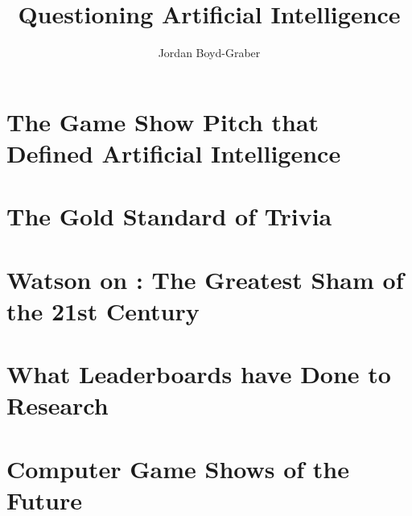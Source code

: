 \documentclass[bfivepaper,twosided,justified,nobib]{tufte-book}
\title{Questioning Artificial Intelligence}
\author{Jordan Boyd-Graber}
\newcommand{\chapterfile}[2]{\chapter{#2}
  \label{ch:#1}
  }
\begin{document}


% 



\clearpage






\chapterfile{turing}{The Game Show Pitch that Defined Artificial Intelligence}

\chapterfile{qb}{The Gold Standard of Trivia}

\chapter{Watson on \jeopardyp{}: The Greatest Sham of the 21st
  Century}




\chapterfile{leaderboard}{What Leaderboards have Done to \abr{ai} Research}









\chapterfile{game-show}{Computer Game Shows of the Future}





\backmatter





\printindex
\end{document}
